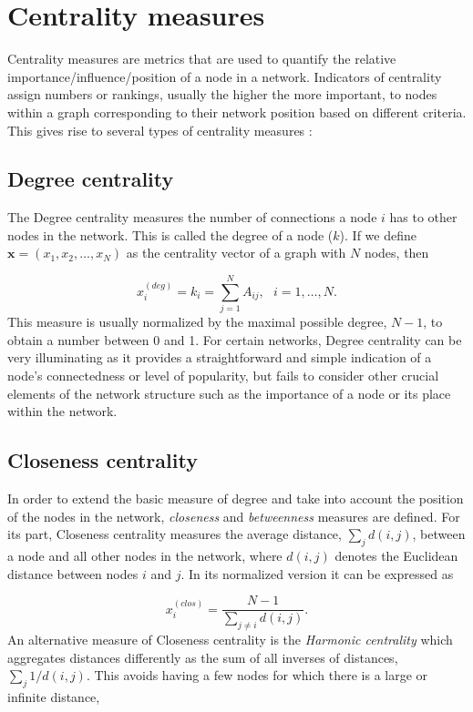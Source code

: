 \section{Centrality measures}
\label{sec:centra}
 Centrality measures are metrics that are used to quantify the relative importance/influence/position of a node in a network. Indicators of centrality assign numbers or rankings, usually the higher the more important, to nodes within a graph corresponding to their network position based on different criteria. This gives rise to several types of centrality measures \cite{newman2018networks}:

\subsection*{Degree centrality} The Degree centrality measures the number of connections a node $i$ has to other nodes in the network. This is called the degree of a node ($k$). If we define $\mathbf{x}=(x_1,x_2,\dots,x_N)$ as the centrality vector of a graph with $N$ nodes, then 

\begin{equation}
    x_i^{(deg)}=k_i=\sum_{j=1}^{N}A_{ij}, ~~~i = 1,\dots, N.
\end{equation}
This measure is usually normalized by the maximal possible degree, $N − 1$, to obtain a number between 0 and 1. For certain networks, Degree centrality can be very illuminating as it provides a straightforward and simple indication of a node's connectedness or level of popularity, but fails to consider other crucial elements of the network structure such as the importance of a node or its place within the network.

\subsection*{Closeness centrality} In order to extend the basic measure of degree and take into account the position of the nodes in the network, \textit{closeness} and \textit{betweenness} measures are defined. For its part, Closeness centrality measures the average distance, $\sum_{j}^{}d(i,j)$, between a node and all other nodes in the network, where $d(i,j)$ denotes the Euclidean distance between nodes $i$ and $j$. In its normalized version it can be expressed as

\begin{equation}
    x_i^{(clos)}= \frac{N-1}{\sum_{j\ne i}^{}d(i,j)}.
\end{equation}
An alternative measure of Closeness centrality is the \textit{Harmonic centrality} which aggregates distances differently as the sum of all inverses
of distances, $\sum_{j}^{}1/d(i,j)$. This avoids having a few nodes for which there is a large or infinite distance,

